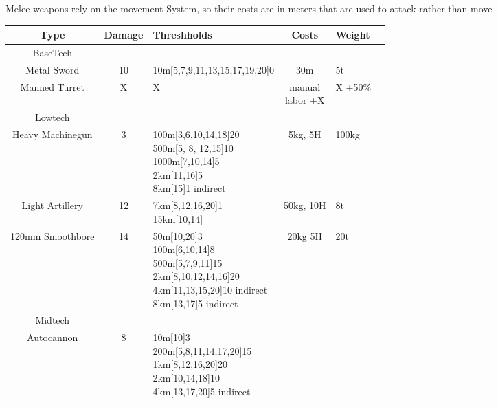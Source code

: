Melee weapons rely on the movement System, so their costs are in meters that are used to attack rather than move\par
\begin{tabular}{c|clcll}
    Type & Damage & Threshholds & Costs & Weight\\
    \hline BaseTech&&&&&\\
    Metal Sword & 10 & 10m[5,7,9,11,13,15,17,19,20]0 & 30m & 5t \\
    Manned Turret & X & X & \makecell[l]{manual \\labor +X} &  X +50\% \\
    \hline Lowtech &&&&&\\
    Heavy Machinegun & 3 & \makecell[l]{100m[3,6,10,14,18]20\\
                                        500m[5, 8, 12,15]10\\
                                        1000m[7,10,14]5\\
                                        2km[11,16]5\\
                                        8km[15]1 indirect}
                                            & 5kg, 5H & 100kg \\
    Light Artillery & 12 & \makecell[l]{7km[8,12,16,20]1 \\
                                        15km[10,14]}& 50kg, 10H & 8t  \\
    120mm Smoothbore & 14 & \makecell[l]{50m[10,20]3\\
                                        100m[6,10,14]8\\
                                        500m[5,7,9,11]15\\
                                        2km[8,10,12,14,16]20\\
                                        4km[11,13,15,20]10 indirect\\
                                        8km[13,17]5 indirect}
                                            & 20kg 5H & 20t \\
    \hline Midtech &&&&&\\
    Autocannon & 8 & \makecell[l]{10m[10]3\\
                                  200m[5,8,11,14,17,20]15\\
                                  1km[8,12,16,20]20\\
                                  2km[10,14,18]10 \\
                                  4km[13,17,20]5 indirect }

\end{tabular}
